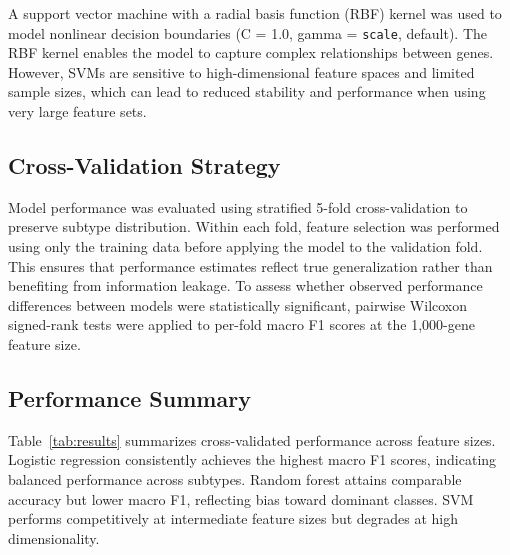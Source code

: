 \documentclass[10pt,twocolumn,letterpaper]{article}
\begin{document}
A support vector machine with a radial basis function (RBF) kernel was used to model nonlinear decision boundaries \cite{cortes1995} (C = 1.0, gamma = \texttt{scale}, default). The RBF kernel enables the model to capture complex relationships between genes. However, SVMs are sensitive to high-dimensional feature spaces and limited sample sizes, which can lead to reduced stability and performance when using very large feature sets.

\subsection{Cross-Validation Strategy}

Model performance was evaluated using stratified 5-fold cross-validation to preserve subtype distribution. Within each fold, feature selection was performed using only the training data before applying the model to the validation fold. This ensures that performance estimates reflect true generalization rather than benefiting from information leakage. To assess whether observed performance differences between models were statistically significant, pairwise Wilcoxon signed-rank tests were applied to per-fold macro F1 scores at the 1,000-gene feature size.

\subsection{Performance Summary}

Table~\ref{tab:results} summarizes cross-validated performance across feature sizes. Logistic regression consistently achieves the highest macro F1 scores, indicating balanced performance across subtypes. Random forest attains comparable accuracy but lower macro F1, reflecting bias toward dominant classes. SVM performs competitively at intermediate feature sizes but degrades at high dimensionality.
\end{document}
